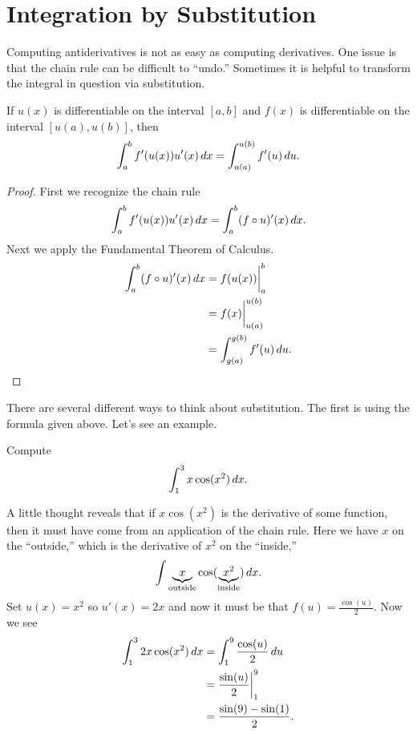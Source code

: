 \chapter{Integration by Substitution}

Computing antiderivatives is not as easy as computing derivatives. One
issue is that the chain rule can be difficult to ``undo.'' Sometimes 
it is helpful to transform the integral in question via substitution. 

\begin{mainTheorem} 
If $u(x)$ is differentiable on the interval $[a,b]$ and $f(x)$ is
differentiable on the interval $[u(a),u(b)]$, then
\[
\int_a^b f'(u(x)) u'(x) \, d x =\int_{u(a)}^{u(b)} f'(u) \, d u.
\]
\end{mainTheorem}
\begin{proof} First we recognize the chain rule
\[
\int_a^b f'(u(x)) u'(x) \, d x = \int_a^b (f\circ u)'(x) \, d x.
\]
Next we apply the Fundamental Theorem of Calculus. 
\begin{align*} 
\int_a^b (f\circ u)'(x) \, d x &= f(u(x)) \bigg|_a^b \\
&= f(x) \bigg|_{u(a)}^{u(b)}\\ 
&= \int_{g(a)}^{g(b)} f'(u) \, d u.
\end{align*}
\end{proof}


There are several different ways to think about substitution. The
first is using the formula given above. Let's see an example. 
\begin{example}
Compute
\[
\int_1^3 x\cos(x^2)\, d x.
\]
\end{example}


\begin{solution}
A little thought reveals that if $x\cos(x^2)$ is the derivative of
some function, then it must have come from an application of the chain
rule. Here we have $x$ on the ``outside,'' which is the derivative of
$x^2$ on the ``inside,'' 
\[
\int \underbrace{x}_{\text{outside}}\cos(\underbrace{x^2}_{\text{inside}})\, d x.
\]
Set $u(x) = x^2$ so $u'(x) = 2x$ and now it must be that $f(u) =
\frac{\cos(u)}{2}$. Now we see
\begin{align*}
\int_1^3 2x\cos(x^2)\, d x &= \int_1^9 \frac{\cos(u)}{2}\, d u\\
&= \frac{\sin(u)}{2} \bigg|_1^9 \\
&= \frac{\sin(9) -\sin(1)}{2}.
\end{align*}
\end{solution}

